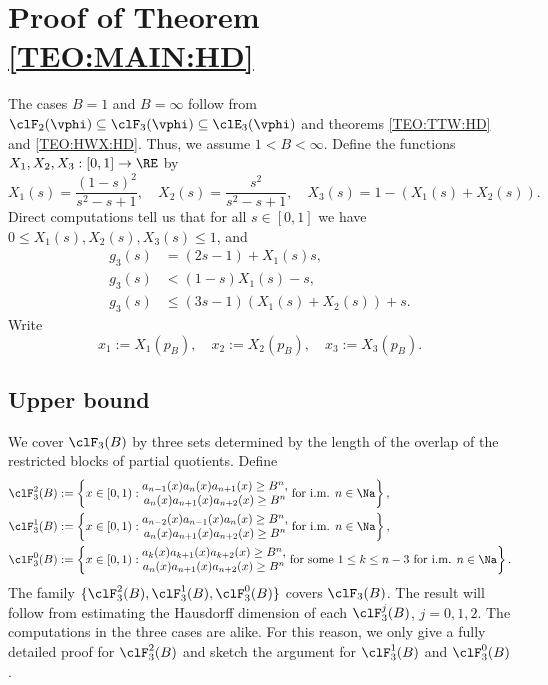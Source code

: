 \documentclass[12pt,a4paper]{amsart}
\begin{document}
\section{Proof of Theorem \ref{TEO:MAIN:HD}}\label{Section:ProofHD}

The cases $B=1$ and $B=\infty$ follow from $\clF_2(\vphi)\subseteq \clF_3(\vphi)\subseteq \clE_3(\vphi)$ and theorems \ref{TEO:TTW:HD} and \ref{TEO:HWX:HD}. Thus, we assume $1<B<\infty$. Define the functions $X_1,X_2,X_3:[0,1]\to\RE$ by
\[
X_1(s)= \frac{(1-s )^2}{s^2-s+1},  
\quad
X_2(s)= \frac{s^2}{s^2-s+1},  
\quad 
X_3(s)=1-(X_1(s) + X_2(s)).
\]
Direct computations tell us that for all $s\in [0,1]$ we have $0\leq X_1(s),X_2(s),X_3(s)\leq 1$,  and
\begin{align}
g_3(s) &= (2s-1) + X_1(s)s, \label{Eq:EqAux:01} \\
g_3(s) &< (1-s)X_1(s) - s, \label{Eq:EqAux:02} \\
g_3(s) &\leq (3s-1)(X_1(s) + X_2(s)) + s. \label{Eq:EqAux:03}
\end{align}
Write
\[
x_1:=X_1(p_B), \quad
x_2:=X_2(p_B), \quad
x_3:=X_3(p_B).
\]
\subsection{Upper bound}

We cover $\clF_3(B)$ by three sets determined by the length of the overlap of the restricted blocks of partial quotients.  Define 
\begin{align*}
\clF_{3}^{2}(B)
&:=
\left\{ x\in [0,1): 
\begin{matrix}
a_{n-1}(x) a_{n}(x)a_{n+1}(x) \geq B^n, \\
a_{n}(x)a_{n+1}(x)a_{n+2}(x) \geq B^n 
\end{matrix}
\text{ for i.m.   } n\in\Na \right\}, \\
\clF_{3}^{1}(B)
&:=
\left\{ x\in [0,1): 
\begin{matrix}
a_{n-2}(x) a_{n-1}(x) a_{n}(x) \geq B^n, \\
a_{n}(x) a_{n+1}(x) a_{n+2}(x) \geq B^n 
\end{matrix}
\text{ for i.m.   }n\in\Na\right\}, \\
\clF_{3}^{0}(B)
&:=
\left\{x\in [0,1): 
\begin{matrix}
a_{k}(x)a_{k+1}(x)a_{k+2}(x)\geq B^n, \\
a_{n}(x)a_{n+1}(x)a_{n+2}(x)\geq B^n
\end{matrix}
\text{ for some } 1\leq k\leq n-3 \text{ for i.m.   } n\in\Na \right\}.
\end{align*}
The family $\{\clF_{3}^{2}(B), \clF_{3}^{1}(B), \clF_{3}^{0}(B)\}$ covers $\clF_{3}(B)$. The result will follow from estimating the Hausdorff dimension of each $\clF_{3}^{j}(B)$, $j=0,1,2$. The computations in the three cases are alike. For this reason, we only give a fully detailed proof for $\clF_3^2(B)$ and sketch the argument for $\clF_3^1(B)$ and $\clF_3^0(B)$.
\end{document}
